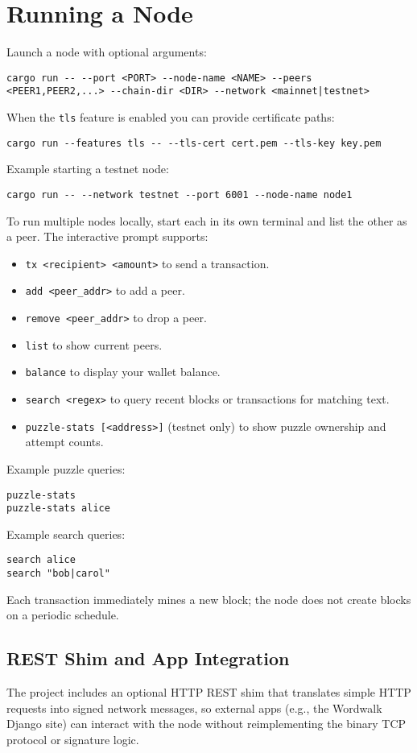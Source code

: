 \chapter{Running a Node}
Launch a node with optional arguments:
\begin{verbatim}
cargo run -- --port <PORT> --node-name <NAME> --peers <PEER1,PEER2,...> --chain-dir <DIR> --network <mainnet|testnet>
\end{verbatim}
When the \texttt{tls} feature is enabled you can provide certificate paths:
\begin{verbatim}
cargo run --features tls -- --tls-cert cert.pem --tls-key key.pem
\end{verbatim}
Example starting a testnet node:
\begin{verbatim}
cargo run -- --network testnet --port 6001 --node-name node1
\end{verbatim}
To run multiple nodes locally, start each in its own terminal and list the other as a peer. The interactive prompt supports:
\begin{itemize}
\item \texttt{tx <recipient> <amount>} to send a transaction.
\item \texttt{add <peer\_addr>} to add a peer.
\item \texttt{remove <peer\_addr>} to drop a peer.
\item \texttt{list} to show current peers.
\item \texttt{balance} to display your wallet balance.
\item \texttt{search <regex>} to query recent blocks or transactions for matching text.
\item \texttt{puzzle-stats [<address>]} (testnet only) to show puzzle ownership and attempt counts.
\end{itemize}
Example puzzle queries:
\begin{verbatim}
puzzle-stats
puzzle-stats alice
\end{verbatim}

Example search queries:
\begin{verbatim}
search alice
search "bob|carol"
\end{verbatim}

Each transaction immediately mines a new block; the node does not create blocks on a periodic schedule.

\section{REST Shim and App Integration}
The project includes an optional HTTP REST shim that translates simple HTTP requests into signed network messages, so external apps (e.g., the Wordwalk Django site) can interact with the node without reimplementing the binary TCP protocol or signature logic.

